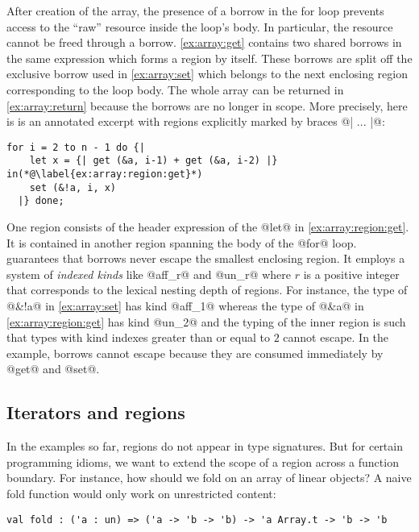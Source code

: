 After
creation of the array, the presence of a borrow in the for loop
prevents access to the ``raw'' resource inside the loop's
body. In particular, the resource cannot be freed through a
borrow. \cref{ex:array:get} contains two shared borrows 
in the same expression which forms a region by itself. These borrows
are split off the exclusive borrow used in \cref{ex:array:set} which
belongs to the next enclosing region corresponding to the loop body.
The whole array can be returned in \cref{ex:array:return} because  the
borrows are no longer in scope.
%
More precisely, here is is an annotated excerpt with regions explicitly
marked by braces @{| ... |}@:
\begin{lstlisting}[firstnumber=3]
  for i = 2 to n - 1 do {|
    let x = {| get (&a, i-1) + get (&a, i-2) |} in(*@\label{ex:array:region:get}*)
    set (&!a, i, x)
  |} done;
\end{lstlisting}

One region consists of the header expression of the @let@ in
\cref{ex:array:region:get}. It is contained in another region
spanning the body of the @for@ loop. \lang guarantees that borrows
never escape the smallest enclosing region. It employs a system of
\emph{indexed kinds} like @aff_r@ and @un_r@ where
$r$ is a positive integer that corresponds to the lexical nesting
depth of regions. For instance, the type of @&!a@ in
\cref{ex:array:set} has kind @aff_1@ whereas the type of
@&a@ in \cref{ex:array:region:get} has kind
@un_2@ and the typing of the inner region is such that types with
kind indexes greater than or equal to $2$ cannot escape.
In the example, borrows cannot escape  because they are consumed
immediately by @get@ and @set@.



\subsection{Iterators and regions}
\label{tuto:vector}

In the examples so far, regions do not appear in type signatures.
But for certain programming idioms, we want to extend the scope of a
region across a function boundary.
For instance, how should we fold on an array of linear objects?
A naive fold function would only work on unrestricted content:
\begin{lstlisting}
val fold : ('a : un) => ('a -> 'b -> 'b) -> 'a Array.t -> 'b -> 'b
\end{lstlisting}


